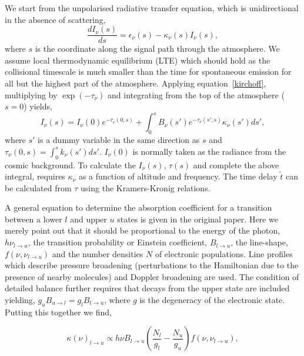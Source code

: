 We start from the unpolarised radiative transfer equation, which is unidirectional in the absence of scattering,
\begin{equation}\label{eq:rad_trans}
\frac{dI_\nu (s) }{ds} = \epsilon_\nu(s) -\kappa_\nu(s)  I_\nu (s),
\end{equation}
where $s$ is the coordinate along the signal path through the atmosphere. We assume local thermodynamic equilibrium (LTE) which should hold as the collisional timescale is much smaller than the time for spontaneous emission for all but the highest part of the atmosphere. Applying equation~\ref{kirchoff}, multiplying by $\exp(-\tau_\nu)$ and integrating from the top of the atmosphere ($s=0$) yields, 
\begin{equation}\label{eq:rad_trans2}
I_\nu(s) = I_\nu(0) e^{-\tau_\nu (0,s) }+ \int_0^s B_\nu(s')e^{-\tau_\nu (s',s) }\kappa_\nu(s')ds',
\end{equation}
where  $s'$ is a dummy variable in the same direction as $s$ and $\tau_\nu (0,s) = \int_0^{s} k_\nu(s')ds'$. $I_\nu(0)$ is normally taken as the radiance from the cosmic background.
To calculate the $I_\nu(s)$, $\tau(s)$ and complete the above integral, requires $\kappa_\nu$ as a function of altitude and frequency. The time delay $\tilde{t}$ can be calculated from $\tau$ using the Kramers-Kronig relations. 


A general equation to determine the absorption coefficient for a transition between a lower $l$ and upper $u$ states is given in the original paper. Here we merely point out that it should be proportional to the energy of the photon, $h\nu_{l \to u}$, the transition probability or Einstein coefficient, $ B_{l \to u}$, the line-shape, $f(\nu,\nu_{l \to u})$ and the number densities $N$ of electronic populations. Line profiles which describe pressure broadening (perturbations to the Hamiltonian due to the presence of nearby molecules) and Doppler broadening are used. The condition of detailed balance further requires that decays from the upper state are included yielding, $g_u B_{u \to l} =g_l B_{l \to u}$, where $g$ is the degeneracy of the electronic state. Putting this together we find,

\begin{equation}
\kappa(\nu) _{l \to u}  \propto  h\nu   B_{l \to u}  \left(\frac{N_l}{g_l}  -  \frac{N_u}{g_u} \right) f(\nu,\nu_{l \to u}),
\end{equation}

